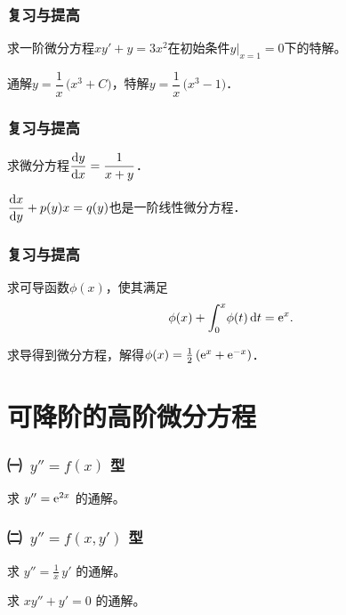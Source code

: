 \documentclass[14pt,notheorems,leqno,xcolor={rgb}]{beamer} %
\begin{document}
\begin{frame}
\frametitle{复习与提高}
\begin{review}
求一阶微分方程$xy'+y=3x^2$在初始条件$y|_{x=1}=0$下的特解。
\end{review}
\pause
\begin{solution}
通解$y=\dfrac{1}{x}\,\Big(x^3+C\Big)$，特解$y=\dfrac{1}{x}\,\Big(x^3-1\Big)$．
\end{solution}
\end{frame}

\begin{iframe}
\frametitle{复习与提高}
\begin{puzzle}
求微分方程$\dfrac{\mathop{}\!\mathrm{d} y}{\mathop{}\!\mathrm{d} x}=\dfrac{1}{x+y}$．
\end{puzzle}
\pause
\begin{remark*}
$\dfrac{\mathop{}\!\mathrm{d} x}{\mathop{}\!\mathrm{d} y}+p(y)x=q(y)$也是一阶线性微分方程．
\end{remark*}
\end{iframe}

\begin{iframe}
\frametitle{复习与提高}
\begin{puzzle}
求可导函数$\phi(x)$，使其满足
$$\phi(x)+\int_0^x\!\phi(t)\mathop{}\!\mathrm{d} t =\mathrm{e}^x.$$
\end{puzzle}
\pause
\begin{solution}
求导得到微分方程，解得$\phi(x)=\frac12\left(\mathrm{e}^x+\mathrm{e}^{-x}\right)$．
\end{solution}
\end{iframe}

\section{可降阶的高阶微分方程}

\begin{frame}
\frametitle{㈠\ $y''=f(x)$ 型}
\begin{example}
求 $y''=\mathrm{e}^{2x}$ 的通解。
\end{example}
\end{frame}

\begin{frame}
\frametitle{㈡\ $y''=f(x,y')$ 型}
\begin{example}
求 $y''=\frac1x\, y'$ 的通解。
\end{example}
\pause
\begin{exercise}
求 $xy''+y'=0$ 的通解。
\end{exercise}
\end{frame}
\end{document}
